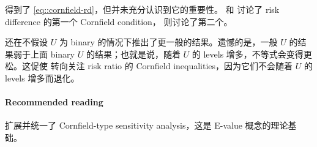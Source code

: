 \citet{Cornfield::1959} 得到了 \eqref{eq::cornfield-rd}，但并未充分认识到它的重要性。\citet{gastwirth1998cornfield} 和 \citet{poole2010origin} 讨论了 risk difference 的第一个 Cornfield condition，\citet{ding2014generalized} 则讨论了第二个。

\citet{ding2014generalized} 还在不假设 $U$ 为 binary 的情况下推出了更一般的结果。遗憾的是，一般 $U$ 的结果弱于上面 binary $U$ 的结果；也就是说，随着 $U$ 的 levels 增多，不等式会变得更松。这促使 \citet{ding2016sensitivity} 转向关注 risk ratio 的 Cornfield inequalities，因为它们不会随着 $U$ 的 levels 增多而退化。




\paragraph{Recommended reading}


\citet{ding2016sensitivity} 扩展并统一了 Cornfield-type sensitivity analysis，这是 E-value 概念的理论基础。
